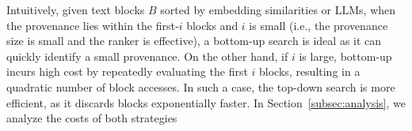 Intuitively, given text blocks $B$ sorted by embedding similarities or LLMs, when the provenance lies within the first‑$i$ blocks and $i$ is small (i.e., the provenance size is small and the ranker is effective), a bottom-up search is ideal as it can quickly identify a small provenance. On the other hand, if $i$ is large, bottom-up incurs high cost by repeatedly evaluating the first $i$ blocks, resulting in a quadratic number of block accesses. In such a case, the top-down search is more efficient, as it discards blocks exponentially faster. In Section~\ref{subsec:analysis}, we analyze the costs of both strategies    


